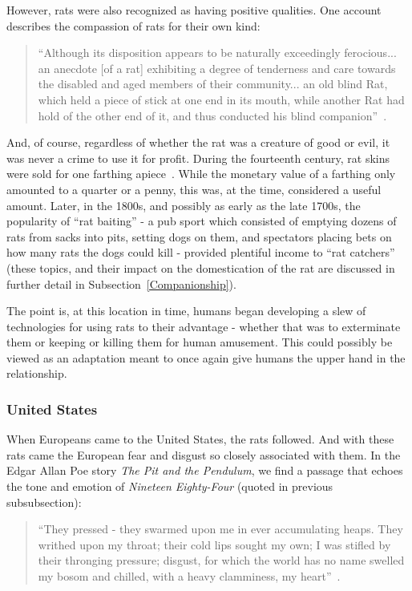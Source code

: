 \documentclass[12pt]{article}
\begin{document}
However, rats were also recognized as having positive qualities. One account describes the compassion of rats for their own kind:

\begin{quote}
``Although its disposition appears to be naturally exceedingly ferocious... an anecdote [of a rat] exhibiting a degree of tenderness and care towards the disabled and aged members of their community... an old blind Rat, which held a piece of stick at one end in its mouth, while another Rat had hold of the other end of it, and thus conducted his blind companion''~\cite{Barnett2001, Marrin2006}.
\end{quote}

And, of course, regardless of whether the rat was a creature of good or evil, it was never a crime to use it for profit. During the fourteenth century, rat skins were sold for one farthing apiece~\cite{Barnett2001}. While the monetary value of a farthing only amounted to a quarter or a penny, this was, at the time, considered a useful amount. Later, in the 1800s, and possibly as early as the late 1700s, the popularity of ``rat baiting'' - a pub sport which consisted of emptying dozens of rats from sacks into pits, setting dogs on them, and spectators placing bets on how many rats the dogs could kill - provided plentiful income to ``rat catchers'' (these topics, and their impact on the domestication of the rat are discussed in further detail in Subsection~\ref{Companionship}).

The point is, at this location in time, humans began developing a slew of technologies for using rats to their advantage - whether that was to exterminate them or keeping or killing them for human amusement. This could possibly be viewed as an adaptation meant to once again give humans the upper hand in the relationship.

\subsubsection{United States}

When Europeans came to the United States, the rats followed. And with these rats came the European fear and disgust so closely associated with them. In the Edgar Allan Poe story \textit{The Pit and the Pendulum}, we find a passage that echoes the tone and emotion of \textit{Nineteen Eighty-Four} (quoted in previous subsubsection):

\begin{quote}
``They pressed - they swarmed upon me in ever accumulating heaps. They writhed upon my throat; their cold lips sought my own; I was stifled by their thronging pressure; disgust, for which the world has no name swelled my bosom and chilled, with a heavy clamminess, my heart''~\cite{ONeill}.
\end{quote}
\end{document}
